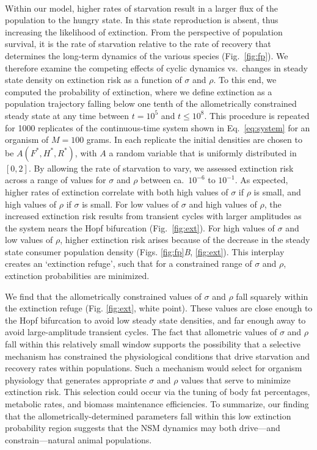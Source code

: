\documentclass[11pt]{article}
\begin{document}
\begin{multicols}{2}
\\
Within our model, higher rates of starvation result in a larger flux of the population to the hungry state.  
In this state reproduction is absent, thus increasing the likelihood of extinction.  From the perspective of population survival, it is the rate of starvation relative to the rate of recovery that determines the long-term dynamics of the various species (Fig.~\ref{fig:fp}). 
We therefore examine the competing effects of cyclic dynamics vs.\ changes in steady state density on extinction risk as a function of $\sigma$ and $\rho$.  
To this end, we computed the probability of extinction, where we define extinction as a population trajectory falling below one tenth of the allometrically constrained steady state at any time between $t=10^5$ and $t \leq 10^8$.  
This procedure is repeated for 1000 replicates of the continuous-time system shown in Eq.~\ref{eq:system} for an organism of $M=100$ grams.
In each replicate the initial densities are chosen to be $A(F^*,H^*,R^*)$, with $A$ a random variable that is uniformly distributed in $[0,2]$.  
By allowing the rate of starvation to vary, we assessed extinction risk across a range of values for $\sigma$ and $\rho$ between ca.\ $10^{-6}$ to $10^{-1}$. 
As expected, higher rates of extinction correlate with both high values of $\sigma$ if $\rho$ is small, and high values of $\rho$ if $\sigma$ is small.  
For low values of $\sigma$ and high values of $\rho$, the increased extinction risk results from transient cycles with larger amplitudes as the system nears the Hopf bifurcation (Fig.~\ref{fig:ext}).  
For high values of $\sigma$ and low values of $\rho$, higher extinction risk arises because of the decrease in the steady state consumer population density (Figs. \ref{fig:fp}\emph{B}, \ref{fig:ext}).  
This interplay creates an `extinction refuge', such that for a constrained range of $\sigma$ and $\rho$, extinction probabilities are minimized.

We find that the allometrically constrained values of $\sigma$ and $\rho$ fall squarely within the extinction refuge (Fig. \ref{fig:ext}, white point). 
These values are close enough to the Hopf bifurcation to avoid low steady state densities, and far enough away to avoid large-amplitude transient cycles. 
The fact that allometric values of $\sigma$ and $\rho$ fall within this relatively small window supports the possibility that a selective mechanism has constrained the physiological conditions that drive starvation and recovery rates within populations.  
Such a mechanism would select for organism physiology that generates appropriate $\sigma$ and $\rho$ values that serve to minimize extinction risk.  
This selection could occur via the tuning of body fat percentages, metabolic rates, and biomass maintenance efficiencies.
To summarize, our finding that the allometrically-determined parameters fall within this low extinction probability region suggests that the NSM dynamics may both drive---and constrain---natural animal populations.\\





\end{multicols}
\end{document}
